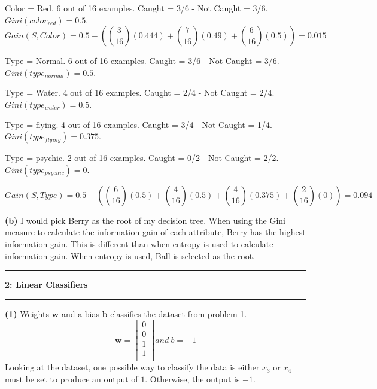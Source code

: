 \documentclass[11pt]{article}
\newcommand\question[2]{\vspace{.25in}\hrule\textbf{#1: #2}\vspace{.5em}\hrule\vspace{.10in}}
\renewcommand\part[1]{\vspace{.10in}\textbf{(#1)}}
\begin{document}
Color = Red. 6 out of 16 examples. Caught = 3/6 - Not Caught = 3/6. $Gini(color_{red}) = 0.5$.
$$Gain(S, Color) = 0.5 - ((\frac{3}{16})(0.444) + (\frac{7}{16})(0.49) + (\frac{6}{16})(0.5)) = 0.015$$

 \par 

Type = Normal. 6 out of 16 examples. Caught = 3/6 - Not Caught = 3/6. $Gini(type_{normal}) = 0.5$.

Type = Water. 4 out of 16 examples. Caught = 2/4 - Not Caught = 2/4. $Gini(type_{water}) = 0.5$.

Type = flying. 4 out of 16 examples. Caught = 3/4 - Not Caught = 1/4. $Gini(type_{flying}) = 0.375$.

Type = psychic. 2 out of 16 examples. Caught = 0/2 - Not Caught = 2/2. $Gini(type_{psychic}) = 0$.

$$Gain(S, Type) = 0.5 - ((\frac{6}{16})(0.5) + (\frac{4}{16})(0.5) + (\frac{4}{16})(0.375) + (\frac{2}{16})(0)) = 0.094$$

 \par 



\qquad \part{b} I would pick Berry as the root of my decision tree. When using the Gini measure to calculate the information gain of each attribute, Berry has the highest information gain. This is different than when entropy is used to calculate information gain. When entropy is used, Ball is selected as the root.


\question{2}{Linear Classifiers}

\part{1} Weights $\mathbf{w}$ and a bias $\mathbf{b}$ classifies the dataset from problem 1.
$$
\mathbf{w} = \begin{bmatrix}
0 \\
0 \\
1 \\
1 \\ 	
\end{bmatrix}
 and \ b = -1
$$
Looking at the dataset, one possible way to classify the data is either $x_3$ or $x_4$ must be set to produce an output of $1$. Otherwise, the output is $-1$.
\newpage
\end{document}
